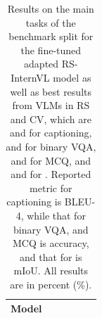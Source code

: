 \begin{table}[h!tb]
    \centering
    \renewcommand{\arraystretch}{\arrayStretchFactor}
    \caption{Results on the main tasks of the \bentxt{} benchmark split for the fine-tuned adapted RS-InternVL model as well as best results from \ac{VLM}s in \ac{RS} and \ac{CV}, which are \earthmindrgbABBR{} and \llavaABBR{} for captioning, \earthdialrgbABBR{} and \qwenABBR{} for binary \ac{VQA}, \earthmindsarmsABBR{} and \qwenABBR{} for \ac{MCQ}, and \earthmindsarmsABBR{} and \gptABBR{} for \genDet. 
    Reported metric for captioning is BLEU-4, while that for binary \ac{VQA}, and \ac{MCQ} is accuracy, and that for \genDet{} is mIoU. All results are in percent (\%).}
    \begin{tabular}{l *5{S[table-format=2.2]}}
        \toprule
        {Model}
        & {}
        & {}
        & {} 
        & {}%
        \\
        \midrule

\end{tabular}
\end{table}
